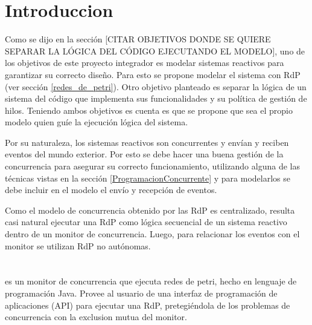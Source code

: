 \section{Introduccion}

Como se dijo en la sección [{\color{red}CITAR OBJETIVOS DONDE SE QUIERE
SEPARAR LA LÓGICA DEL CÓDIGO EJECUTANDO EL MODELO}], uno de los objetivos de
este proyecto integrador es {\color{blue} modelar sistemas reactivos para garantizar su correcto
diseño}.
Para esto se propone modelar el sistema con RdP (ver sección \ref{redes_de_petri}).
Otro objetivo planteado es {\color{blue} separar la lógica de un sistema del
código que implementa sus funcionalidades y su política de gestión de hilos}.
Teniendo ambos objetivos es cuenta es que se propone que sea el propio modelo
quien guíe la ejecución lógica del sistema.

Por su naturaleza, los sistemas reactivos son concurrentes y envían y reciben
eventos del mundo exterior.
Por esto se debe hacer una buena gestión de la concurrencia para asegurar su correcto
funcionamiento, utilizando alguna de las técnicas vistas en
la sección \ref{ProgramacionConcurrente} y para modelarlos se debe incluir en
el modelo el envío y recepción de eventos.

Como el modelo de concurrencia obtenido por las RdP es centralizado, resulta
casi natural ejecutar una RdP como lógica secuencial de un sistema reactivo
dentro de un monitor de concurrencia. Luego, para relacionar los eventos con el
monitor se utilizan RdP no autónomas.

\section{\javapetriconcurrencymonitor}

\javapetriconcurrencymonitor es un monitor de concurrencia que ejecuta redes
de petri, hecho en lenguaje de programación Java.
Provee al usuario de una interfaz de programación de aplicaciones (API) para
ejecutar una RdP, pretegiéndola de los problemas de concurrencia con la
exclusion mutua del monitor.

